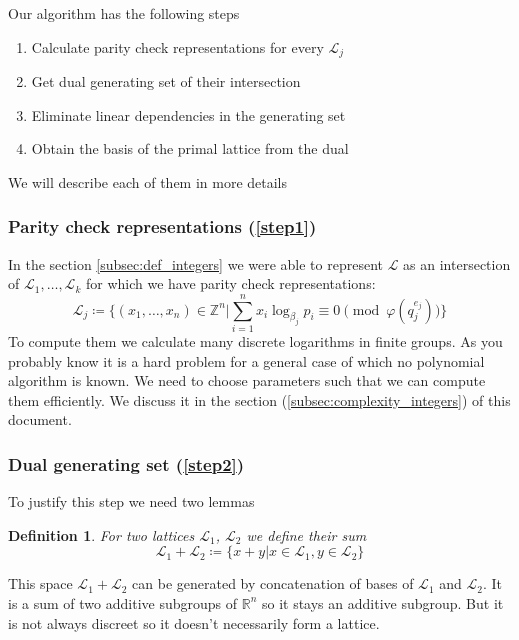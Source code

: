 \documentclass[12pt]{article}
\newcommand{\ZZ}{\mathbb{Z}}
\newcommand{\LL}{\mathcal{L}}
\newtheorem{definition}{Definition}
\begin{document}
 Our algorithm \label{algorithm} has the following steps
\begin{enumerate}
    \item \label{step1} Calculate parity check representations for every $\LL_{j}$
    \item \label{step2} Get dual generating set of their intersection
    \item \label{step3} Eliminate linear dependencies in the generating set
    \item \label{step4} Obtain the basis of the primal lattice from the dual
\end{enumerate}
We will describe each of them in more details

\subsubsection{Parity check representations (\ref{step1})}
\label{subsubsec:parity_check_repr}
In the section \ref{subsec:def_integers} we were able to represent $\LL$ as an intersection of $\LL_{1}, \dots, \LL_{k}$ for which we have parity check representations:
\[
    \LL_{j} \coloneqq \{(x_{1}, \dots, x_{n}) \in \ZZ^{n} | \sum_{i=1}^{n}x_{i}\log_{\beta_{j}}p_{i}\equiv 0 \pmod{\varphi(q_{j}^{e_{j}})}\}
\]
To compute them we calculate many discrete logarithms in finite groups. As you probably know it is a hard problem for a general case of which no polynomial algorithm is known. We need to choose parameters such that we can compute them efficiently. We discuss it in the section (\ref{subsec:complexity_integers}) of this document.

\subsubsection{Dual generating set (\ref{step2})}
\label{subsubsec:dual_gen_set}
To justify this step we need two lemmas
\begin{definition}
    For two lattices $\LL_1$, $\LL_2$ we define their sum
\[
    \LL_1 + \LL_2 \coloneqq \{x + y | x \in \LL_1, y \in \LL_2\}
\]
\end{definition}
This space $\LL_{1} + \LL_{2}$ can be generated by concatenation of bases of $\LL_{1}$ and $\LL_{2}$. It is a sum of two additive subgroups of $\mathbb{R}^{n}$ so it stays an additive subgroup. But it is not always discreet so it doesn't necessarily form a lattice.
\end{document}
